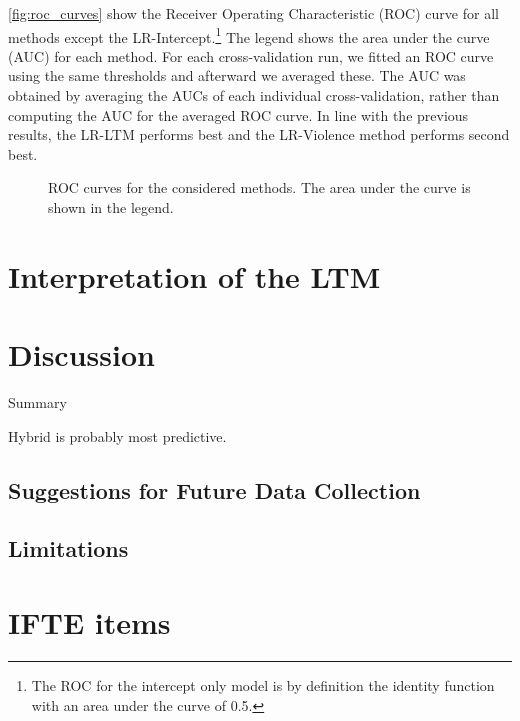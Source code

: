 \documentclass[a4paper,11pt]{article}
\begin{document}
\autoref{fig:roc_curves} show the Receiver Operating Characteristic (ROC) curve for all methods except the LR-Intercept.\footnote{The ROC for the intercept only model is by definition the identity function with an area under the curve of 0.5.}
The legend shows the area under the curve (AUC) for each method.
For each cross-validation run, we fitted an ROC curve using the same thresholds and afterward we averaged these.
The AUC was obtained by averaging the AUCs of each individual cross-validation, rather than computing the AUC for the averaged ROC curve.
In line with the previous results, the LR-LTM performs best and the LR-Violence method performs second best.

\begin{figure}[!ht]
    \centering
    
    \caption{ROC curves for the considered methods. The area under the curve is shown in the legend.}
    \label{fig:roc_curves}
\end{figure}


\section{Interpretation of the LTM}



\section{Discussion}
Summary

Hybrid is probably most predictive.

\subsection{Suggestions for Future Data Collection}



\subsection{Limitations}

\printbibliography
\newpage

\appendix

\section{IFTE items}
\end{document}
